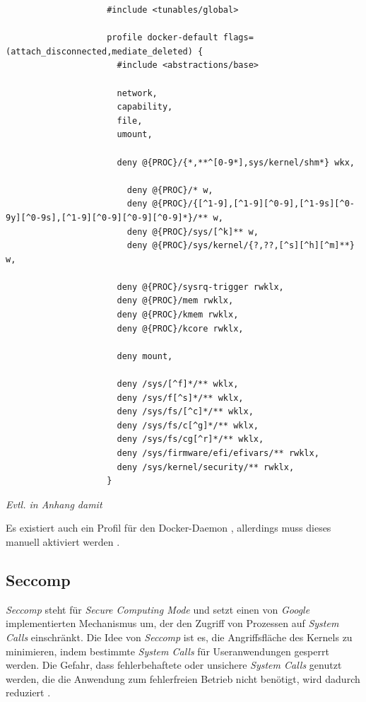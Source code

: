\documentclass[../main.tex]{subfiles}
\begin{document}
				\begin{lstlisting}
					#include <tunables/global>

					profile docker-default flags=(attach_disconnected,mediate_deleted) {
					  #include <abstractions/base>

					  network,
					  capability,
					  file,
					  umount,

					  deny @{PROC}/{*,**^[0-9*],sys/kernel/shm*} wkx,

						deny @{PROC}/* w,
						deny @{PROC}/{[^1-9],[^1-9][^0-9],[^1-9s][^0-9y][^0-9s],[^1-9][^0-9][^0-9][^0-9]*}/** w,
						deny @{PROC}/sys/[^k]** w,
						deny @{PROC}/sys/kernel/{?,??,[^s][^h][^m]**} w,

					  deny @{PROC}/sysrq-trigger rwklx,
					  deny @{PROC}/mem rwklx,
					  deny @{PROC}/kmem rwklx,
					  deny @{PROC}/kcore rwklx,

					  deny mount,

					  deny /sys/[^f]*/** wklx,
					  deny /sys/f[^s]*/** wklx,
					  deny /sys/fs/[^c]*/** wklx,
					  deny /sys/fs/c[^g]*/** wklx,
					  deny /sys/fs/cg[^r]*/** wklx,
					  deny /sys/firmware/efi/efivars/** rwklx,
					  deny /sys/kernel/security/** rwklx,
					}
				\end{lstlisting}
				\emph{Evtl. in Anhang damit}

				Es existiert auch ein Profil für den Docker-Daemon \cite{githubAppArmorProfileDaemon}, allerdings muss dieses manuell aktiviert werden \cite{githubAppArmorDoc}.

    \subsection{Seccomp}

			\emph{Seccomp} steht für \emph{Secure Computing Mode} und setzt einen von \emph{Google} implementierten Mechanismus um, der den Zugriff von Prozessen auf \emph{System Calls} einschränkt. Die Idee von \emph{Seccomp} ist es, die Angriffsfläche des Kernels zu minimieren, indem bestimmte \emph{System Calls} für Useranwendungen gesperrt werden. Die Gefahr, dass fehlerbehaftete oder unsichere \emph{System Calls} genutzt werden, die die Anwendung zum fehlerfreien Betrieb nicht benötigt, wird dadurch reduziert \cite{linuxSecOverview}\cite{seccompGitDesc}\cite{secInFuture}.
\end{document}
